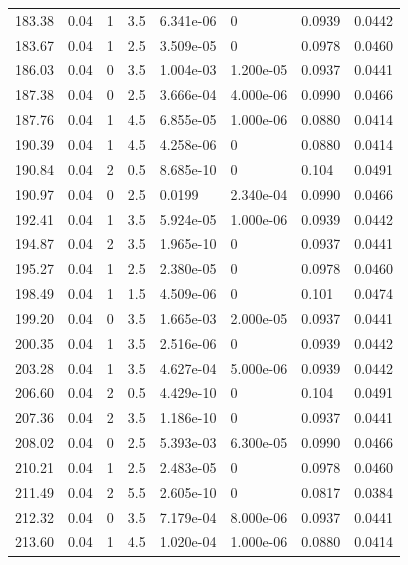 \documentclass[preview]{standalone}
\begin{document}
{{{{\begin{tabular}{L{1.2cm}C{1.2cm} C{0.3cm}C{0.5cm} C{1.4cm}C{1.4cm} C{1.4cm}C{1.4cm}}
  183.38  &  0.04  & 1     & 3.5 &  6.341e-06  & 0  & 0.0939 &  0.0442   \\ 
  183.67  &  0.04  & 1     & 2.5 &  3.509e-05  & 0  & 0.0978 &  0.0460   \\ 
  186.03  &  0.04  & 0     & 3.5 &  1.004e-03  & 1.200e-05  & 0.0937 &  0.0441   \\ 
  187.38  &  0.04  & 0     & 2.5 &  3.666e-04  & 4.000e-06  & 0.0990 &  0.0466   \\ 
  187.76  &  0.04  & 1     & 4.5 &  6.855e-05  & 1.000e-06  & 0.0880 &  0.0414   \\ 
  190.39  &  0.04  & 1     & 4.5 &  4.258e-06  & 0  & 0.0880 &  0.0414   \\ 
  190.84  &  0.04  & 2     & 0.5 &  8.685e-10  & 0  & 0.104 &  0.0491   \\ 
  190.97  &  0.04  & 0     & 2.5 &  0.0199  & 2.340e-04  & 0.0990 &  0.0466   \\ 
  192.41  &  0.04  & 1     & 3.5 &  5.924e-05  & 1.000e-06  & 0.0939 &  0.0442   \\ 
  194.87  &  0.04  & 2     & 3.5 &  1.965e-10  & 0  & 0.0937 &  0.0441   \\ 
  195.27  &  0.04  & 1     & 2.5 &  2.380e-05  & 0  & 0.0978 &  0.0460   \\ 
  198.49  &  0.04  & 1     & 1.5 &  4.509e-06  & 0  & 0.101 &  0.0474   \\ 
  199.20  &  0.04  & 0     & 3.5 &  1.665e-03  & 2.000e-05  & 0.0937 &  0.0441   \\ 
  200.35  &  0.04  & 1     & 3.5 &  2.516e-06  & 0  & 0.0939 &  0.0442   \\ 
  203.28  &  0.04  & 1     & 3.5 &  4.627e-04  & 5.000e-06  & 0.0939 &  0.0442   \\ 
  206.60  &  0.04  & 2     & 0.5 &  4.429e-10  & 0  & 0.104 &  0.0491   \\ 
  207.36  &  0.04  & 2     & 3.5 &  1.186e-10  & 0  & 0.0937 &  0.0441   \\ 
  208.02  &  0.04  & 0     & 2.5 &  5.393e-03  & 6.300e-05  & 0.0990 &  0.0466   \\ 
  210.21  &  0.04  & 1     & 2.5 &  2.483e-05  & 0  & 0.0978 &  0.0460   \\ 
  211.49  &  0.04  & 2     & 5.5 &  2.605e-10  & 0  & 0.0817 &  0.0384   \\ 
  212.32  &  0.04  & 0     & 3.5 &  7.179e-04  & 8.000e-06  & 0.0937 &  0.0441   \\ 
  213.60  &  0.04  & 1     & 4.5 &  1.020e-04  & 1.000e-06  & 0.0880 &  0.0414   \\ 

\end{tabular}}}}}
\end{document}
